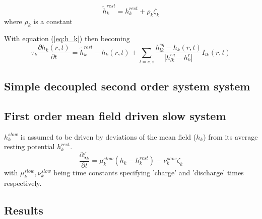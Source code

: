 \documentclass[a4paper,12pt]{article}
\begin{document}
\begin{equation}\label{eq:h_k_aug}
\tilde{h}_k^{rest}=h_k^{rest} + \rho_k\zeta_k
\end{equation}
where $\rho_k$ is a constant



With equation (\ref{eq:h_k}) then becoming
\begin{equation} \label{eq:h_k_aug} 
\tau_k\frac{\partial h_k(r,t)}{\partial t} = \tilde{h}^{rest}_k - h_k(r,t) + \sum_{l=e,i} \frac{h_{lk}^{eq} - h_k(r, t)}{\left| h_{lk}^{eq}-h_k^r\right|}I_{lk}(r,t) 
\end{equation}

\subsection{Simple decoupled second order system system}

\subsection{First order mean field driven slow system}
$h_k^{slow}$ is assumed to be driven by deviations of the mean field ($h_k$) from its average resting potential $h_k^{rest}$. 
\begin{equation} \label{eq:h_k_slow} 
\frac{\partial \zeta_k}{\partial t} = \mu_k^{slow}(h_k - h_k^{rest}) - \nu_k^{slow}\zeta_k
\end{equation}
with $\mu_k^{slow}, \nu_k^{slow}$ being time constants specifying 'charge' and 'discharge' times respectively.


\subsection{Results}
\end{document}
